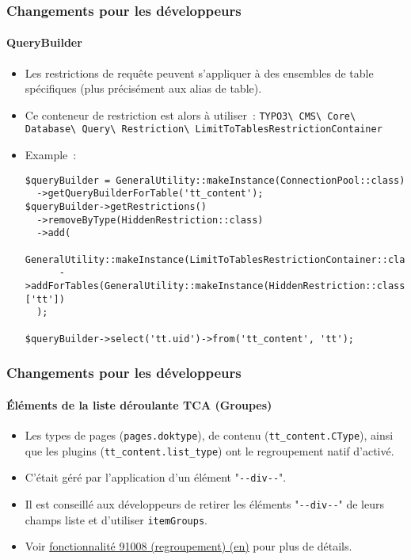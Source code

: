 \begin{frame}[fragile]
	\frametitle{Changements pour les développeurs}
	\framesubtitle{QueryBuilder}

	\lstset{basicstyle=\tiny\ttfamily}

	\begin{itemize}
		\item Les restrictions de requête peuvent s'appliquer à des ensembles
			de table spécifiques (plus précisément aux alias de table).
		\item Ce conteneur de restriction est alors à utiliser~:\newline
			\begingroup
				\fontsize{7}{9}
					\texttt{TYPO3\textbackslash
						CMS\textbackslash
						Core\textbackslash
						Database\textbackslash
						Query\textbackslash
						Restriction\textbackslash
						LimitToTablesRestrictionContainer}
			\endgroup

		\item Example~:
\begin{lstlisting}
$queryBuilder = GeneralUtility::makeInstance(ConnectionPool::class)
  ->getQueryBuilderForTable('tt_content');
$queryBuilder->getRestrictions()
  ->removeByType(HiddenRestriction::class)
  ->add(
    GeneralUtility::makeInstance(LimitToTablesRestrictionContainer::class)
      ->addForTables(GeneralUtility::makeInstance(HiddenRestriction::class), ['tt'])
  );

$queryBuilder->select('tt.uid')->from('tt_content', 'tt');
\end{lstlisting}

	\end{itemize}

\end{frame}


\begin{frame}[fragile]
	\frametitle{Changements pour les développeurs}
	\framesubtitle{Éléments de la liste déroulante TCA (Groupes)}

	\begin{itemize}
		\item Les types de pages (\texttt{pages.doktype}), de contenu (\texttt{tt\_content.CType}),
			ainsi que les plugins (\texttt{tt\_content.list\_type}) ont le regroupement natif d'activé.
		\item C'était géré par l'application d'un élément
			"\texttt{-}\texttt{-div-}\texttt{-}".
		\item Il est conseillé aux développeurs de retirer les éléments
			"\texttt{-}\texttt{-div-}\texttt{-}"
			de leurs champs liste et d'utiliser \texttt{itemGroups}.
		\item Voir
			\href{https://docs.typo3.org/c/typo3/cms-core/master/en-us/Changelog/10.4/Feature-91008-ItemGroupingForTCASelectItems.html}{fonctionnalité 91008 (regroupement) (en)}
			pour plus de détails.
	\end{itemize}

\end{frame}

